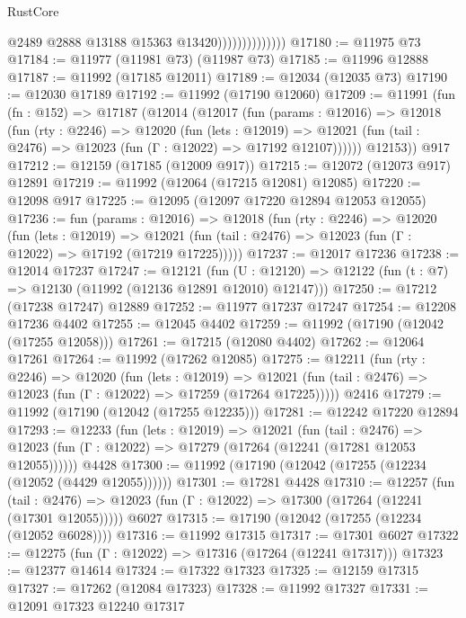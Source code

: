 \begin{lexlean}{RustCore}
\begin{coremodule}
                                @2489
                                @2888
                                @13188
                                @15363
                                @13420))))))))))))))
@17180 := @11975 @73
@17184 := @11977 (@11981 @73) (@11987 @73)
@17185 := @11996 @12888
@17187 := @11992 (@17185 @12011)
@17189 := @12034 (@12035 @73)
@17190 := @12030 @17189
@17192 := @11992 (@17190 @12060)
@17209 := @11991
    (fun (fn : @152) =>
    @17187
      (@12014
        (@12017
          (fun (params : @12016) =>
          @12018
            (fun (rty : @2246) =>
            @12020
              (fun (lets : @12019) =>
              @12021 (fun (tail : @2476) => @12023 (fun (Γ : @12022) => @17192 @12107))))))
        @12153))
    @917
@17212 := @12159 (@17185 (@12009 @917))
@17215 := @12072 (@12073 @917) @12891
@17219 := @11992 (@12064 (@17215 @12081) @12085)
@17220 := @12098 @917
@17225 := @12095 (@12097 @17220 @12894 @12053 @12055)
@17236 := fun (params : @12016) =>
  @12018
    (fun (rty : @2246) =>
    @12020
      (fun (lets : @12019) =>
      @12021 (fun (tail : @2476) => @12023 (fun (Γ : @12022) => @17192 (@17219 @17225)))))
@17237 := @12017 @17236
@17238 := @12014 @17237
@17247 := @12121
    (fun (U : @12120) => @12122 (fun (t : @7) => @12130 (@11992 (@12136 @12891 @12010) @12147)))
@17250 := @17212 (@17238 @17247) @12889
@17252 := @11977 @17237 @17247
@17254 := @12208 @17236 @4402
@17255 := @12045 @4402
@17259 := @11992 (@17190 (@12042 (@17255 @12058)))
@17261 := @17215 (@12080 @4402)
@17262 := @12064 @17261
@17264 := @11992 (@17262 @12085)
@17275 := @12211
    (fun (rty : @2246) =>
    @12020
      (fun (lets : @12019) =>
      @12021 (fun (tail : @2476) => @12023 (fun (Γ : @12022) => @17259 (@17264 @17225)))))
    @2416
@17279 := @11992 (@17190 (@12042 (@17255 @12235)))
@17281 := @12242 @17220 @12894
@17293 := @12233
    (fun (lets : @12019) =>
    @12021
      (fun (tail : @2476) =>
      @12023 (fun (Γ : @12022) => @17279 (@17264 (@12241 (@17281 @12053 @12055))))))
    @4428
@17300 := @11992 (@17190 (@12042 (@17255 (@12234 (@12052 (@4429 @12055))))))
@17301 := @17281 @4428
@17310 := @12257
    (fun (tail : @2476) => @12023 (fun (Γ : @12022) => @17300 (@17264 (@12241 (@17301 @12055)))))
    @6027
@17315 := @17190 (@12042 (@17255 (@12234 (@12052 @6028))))
@17316 := @11992 @17315
@17317 := @17301 @6027
@17322 := @12275 (fun (Γ : @12022) => @17316 (@17264 (@12241 @17317)))
@17323 := @12377 @14614
@17324 := @17322 @17323
@17325 := @12159 @17315
@17327 := @17262 (@12084 @17323)
@17328 := @11992 @17327
@17331 := @12091 @17323 @12240 @17317

\end{coremodule}
\end{lexlean}
